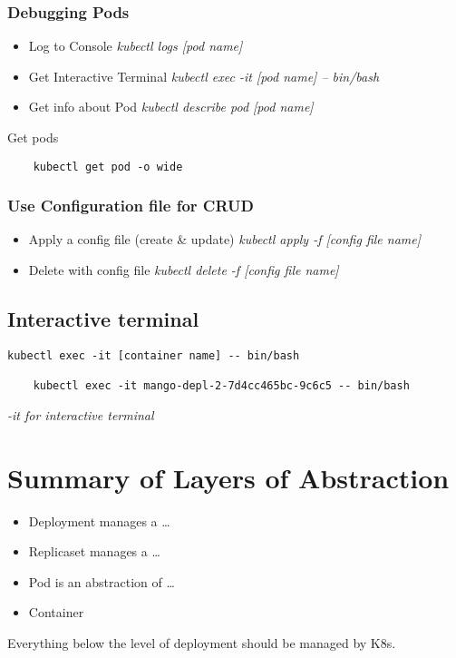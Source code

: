 \subsubsection{Debugging Pods}
\begin{itemize}
    \item Log to Console
    \subitem \it{kubectl logs [pod name]}

    \item Get Interactive Terminal
    \subitem \it{kubectl exec -it [pod name] -- bin/bash}

    \item Get info about Pod
    \subitem \it{kubectl describe pod [pod name]}
\end{itemize}
Get pods
\begin{lstlisting}
    kubectl get pod -o wide
\end{lstlisting}

\subsubsection{Use Configuration file for CRUD}
\begin{itemize}
    \item Apply a config file (create \& update)
    \subitem \it{kubectl apply -f [config file name]}

    \item Delete with config file
    \subitem \it{kubectl delete -f [config file name]}
\end{itemize}

\subsection{Interactive terminal}\label{subsec:interactive-terminal}
\begin{lstlisting}[label={lst:lstlisting14}]
     kubectl exec -it [container name] -- bin/bash

    kubectl exec -it mango-depl-2-7d4cc465bc-9c6c5 -- bin/bash
\end{lstlisting}
\it{-it} for \it{interactive terminal}


\section{Summary of Layers of Abstraction}\label{sec:summary-of-layers-of-abstraction}
\begin{itemize}
    \item Deployment manages a \ldots
    \item Replicaset manages a \ldots
    \item Pod is an abstraction of \ldots
    \item Container
\end{itemize}
Everything below the level of deployment should be managed by K8s.

